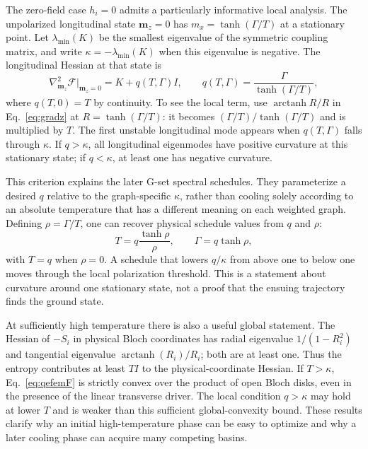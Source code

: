 The zero-field case $h_i=0$ admits a particularly informative local
analysis. The unpolarized longitudinal state $\bm m_z=0$ has
$m_x=\tanh(\Gamma/T)$ at a stationary point. Let $\lambda_{\min}(K)$
be the smallest eigenvalue of the symmetric coupling matrix, and write
$\kappa=-\lambda_{\min}(K)$ when this eigenvalue is negative. The
longitudinal Hessian at that state is
\begin{equation}
 \nabla^2_{\bm m_z}\mathcal F\big|_{\bm m_z=0}
 =K+q(T,\Gamma)I,
 \qquad
 q(T,\Gamma)=\frac{\Gamma}{\tanh(\Gamma/T)},
 \label{eq:stability}
\end{equation}
where $q(T,0)=T$ by continuity. To see the local term, use
$\operatorname{arctanh}R/R$ in Eq.~\eqref{eq:gradz} at
$R=\tanh(\Gamma/T)$: it becomes
$(\Gamma/T)/\tanh(\Gamma/T)$ and is multiplied by $T$.
The first unstable longitudinal mode appears when
$q(T,\Gamma)$ falls through $\kappa$. If $q>\kappa$, all longitudinal
eigenmodes have positive curvature at this stationary state; if
$q<\kappa$, at least one has negative curvature.

This criterion explains the later G-set spectral schedules. They
parameterize a desired $q$ relative to the graph-specific $\kappa$, rather
than cooling solely according to an absolute temperature that has a
different meaning on each weighted graph. Defining
$\rho=\Gamma/T$, one can recover physical schedule values from $q$ and
$\rho$:
\begin{equation}
 T=q\frac{\tanh\rho}{\rho},
 \qquad \Gamma=q\tanh\rho,
 \label{eq:spectralinvert}
\end{equation}
with $T=q$ when $\rho=0$. A schedule that lowers $q/\kappa$ from above
one to below one moves through the local polarization threshold. This
is a statement about curvature around one stationary state, not a proof
that the ensuing trajectory finds the ground state.

At sufficiently high temperature there is also a useful global statement.
The Hessian of $-S_i$ in physical Bloch coordinates has radial eigenvalue
$1/(1-R_i^2)$ and tangential eigenvalue
$\operatorname{arctanh}(R_i)/R_i$; both are at least one. Thus the entropy
contributes at least $T I$ to the physical-coordinate Hessian. If
$T>\kappa$, Eq.~\eqref{eq:qefemF} is strictly convex over the product of
open Bloch disks, even in the presence of the linear transverse driver.
The local condition $q>\kappa$ may hold at lower $T$ and is weaker than
this sufficient global-convexity bound. These results clarify why an
initial high-temperature phase can be easy to optimize and why a later
cooling phase can acquire many competing basins.

